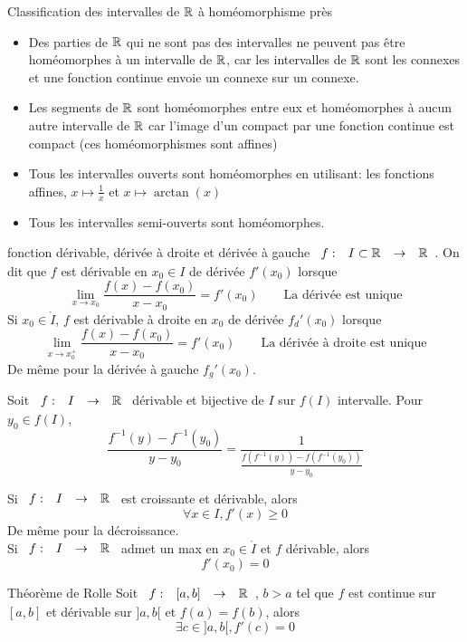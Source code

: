 \documentclass[]{report}
\begin{document}
\begin{prop}{Classification des intervalles de $\mathbb{R}$ à homéomorphisme près}{}
    \begin{itemize}
        \item Des parties de $\mathbb{R}$ qui ne sont pas des intervalles ne peuvent pas être homéomorphes à un intervalle de $\mathbb{R}$, car les intervalles de $\mathbb{R}$ sont les connexes et une fonction continue envoie un connexe sur un connexe.
        \item Les segments de $\mathbb{R}$ sont homéomorphes entre eux et homéomorphes à aucun autre intervalle de $\mathbb{R}$ car l'image d'un compact par une fonction continue est compact (ces homéomorphismes sont affines)
        \item Tous les intervalles ouverts sont homéomorphes en utilisant: les fonctions affines, $x\mapsto \frac{1}{x}$ et $x\mapsto \arctan(x)$
        \item Tous les intervalles semi-ouverts sont homéomorphes.
    \end{itemize}
\end{prop}

\begin{df}{fonction dérivable, dérivée à droite et dérivée à gauche}{}
    $\begin{array}{ccccc} f : & I\subset \mathbb{R} & \to &  \mathbb{R} \end{array}$. On dit que $f$ est dérivable en $x_0\in I$ de dérivée $f'(x_0)$ lorsque
    \[\lim_{x\to x_0}\frac{f(x)-f(x_0)}{x-x_0}=f'(x_0)\qquad \text{La dérivée est unique}\]
    Si $x_0\in \mathring{I}$, $f$ est dérivable à droite en $x_0$ de dérivée $f_d'(x_0)$ lorsque
    \[\lim_{x\to x_0^+}\frac{f(x)-f(x_0)}{x-x_0}=f'(x_0)\qquad \text{La dérivée à droite est unique}\]
    De même pour la dérivée à gauche $f_g'(x_0)$.
\end{df}

Soit $\begin{array}{ccccc} f : & I & \to & \mathbb{R} \end{array}$ dérivable et bijective de $I$ sur $f(I)$ intervalle. Pour $y_0\in f(I)$,
\[\frac{f^{-1}(y)-f^{-1}(y_0)}{y-y_0}=\frac{1}{\frac{f(f^{-1}(y))-f(f^{-1}(y_0))}{y-y_0}}\]

\begin{prop}{}{}
    Si $\begin{array}{ccccc} f : & I & \to & \mathbb{R} \end{array}$ est croissante et dérivable, alors
    \[\forall x\in I,f'(x)\ge 0\]
    De même pour la décroissance.\\
    Si $\begin{array}{ccccc} f : & I & \to & \mathbb{R} \end{array}$ admet un max en $x_0\in \mathring{I}$ et $f$ dérivable, alors
    \[f'(x_0)=0\]
\end{prop}

\begin{tm}{Théorème de Rolle}{}
    Soit $\begin{array}{ccccc} f : & [a,b] & \to & \mathbb{R} \end{array}$, $b>a$ tel que $f$ est continue sur $[a,b]$ et dérivable sur $]a,b[$ et $f(a)=f(b)$, alors
    \[\exists c\in ]a,b[,f'(c)=0\]
\end{tm}
\end{document}
